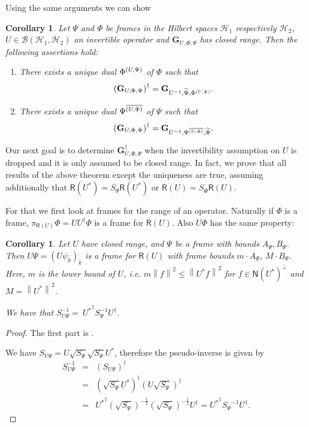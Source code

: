 \documentclass{birkjour}
\newtheorem{cor}[thm]{Corollary}
\theoremstyle{definition}
\theoremstyle{remark}
\numberwithin{equation}{section}
\newcommand{\range}[1]{\mathsf{R}\left( #1 \right)}
\newcommand{\kernel}[1]{\mathsf{N}\left( #1 \right)}
\newcommand{\norm}[2]{
\left\| #2 \right\|_{#1}
}
\def\Hil{\mathcal{H}}
\newcommand{\BL}[1]{
{\mathcal B} \left( #1 \right)
}
\begin{document}
Using the same arguments we can show
\begin{cor} \label{inverseGram2}Let $\Psi$ and $\Phi$ be frames in the Hilbert
spaces  $\mathcal{H}_1$ respectively $\Hil_2$,
  $U\in \BL{\Hil_1,\Hil_2}$  an invertible
operator and $\mathbf{G}_{U,\Phi,\Psi}$ has
 closed range. Then the following assertions hold:
\begin{enumerate}
\item[(1)]  There exists a unique dual $\Phi^{\left(U,\Psi\right)}$ of $\Phi$ such that
\begin{eqnarray*}
\left(\mathbf{G}_{U,\Phi,\Psi}\right)^{\dagger}=\mathbf{G}_{U^{-1},\widetilde{\Psi},\Phi^{\left(U,\Psi\right)}}.
\end{eqnarray*}
\item[(2)]There exists a unique dual $\Psi^{\overline{\left( U,\Phi\right)}}$ of $\Psi$ such that
\begin{eqnarray*}
\left(\mathbf{G}_{U,\Phi,\Psi}\right)^{\dagger}=\mathbf{G}_{U^{-1},\Psi^{\overline{\left( U,\Phi\right)}},\widetilde{\Phi}}.
\end{eqnarray*}
\end{enumerate}
\end{cor}

Our next goal is to determine $\mathbf{G}_{U,\Phi,\Psi}^{\dag}$ when the invertibility assumption on $U$ is dropped and it is only assumed to be closed range. In fact, we prove that all
results of the above theorem except the uniqueness are true, assuming additionally that $\range{U^*}=S_{\Psi}\range{U^*}$ or $\range{U}=S_{\Phi}\range{U}$.

For that we first look at frames for the range of an operator. Naturally if $\Phi$ is a frame, $\pi_{\range{U}}\Phi = UU^{\dag}\Phi$ is a frame for $\range{U}$.
  Also $U\Phi$ has the same property:
	\begin{cor} \label{cor} Let $U$ have closed range, and $\Psi$ be a frame with bounds $A_\Psi, B_\Psi$.
Then  $U\Psi = \left( U \psi_k \right)_k$ is a frame for $\range{U}$ with frame bounds $m \cdot A_\Psi$, $M \cdot B_\Psi$.  Here, $m$ is the lower bound of $U$, i.e.  $m \norm{}{f}^2 \le \norm{}{U^* f}^2$ for $f \in\kernel{U^*}^{\perp}$  and $M = \norm{}{U^*}^2$.

We have that $S_{U \Psi}^{-1}={\ {U^*}^\dagger}  S_{\Psi}^{-1} U^\dagger$.
\end{cor}
\begin{proof} 
The first part is \cite[Proposition 5.3.1]{Chr08}.

We have $S_{U\Psi} = U\sqrt{S_\Psi} \sqrt{S_\Psi}  U^*$, therefore the
pseudo-inverse is given by 
\begin{eqnarray*}S_{U \Psi}^{-1}&=&\left(S_{U \Psi}\right)^{\dagger}\\
&=&\left( \sqrt{S_\Psi}U^*\right)^{\dagger} \left(  U\sqrt{S_\Psi} \right)^\dagger\\
&=& {U^*}^\dagger \left(\sqrt{S_\Psi}\right)^{-\frac{1}{2}} \left(\sqrt{S_\Psi}\right)^{-\frac{1}{2}} U^\dagger
= {U^*}^\dagger {S_\Psi}^{-1} U^\dagger .
\end{eqnarray*}
\end{proof}
  
\end{document}
